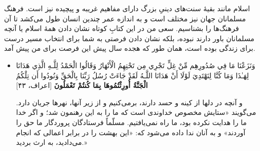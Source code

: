 اسلام مانند بقیهٔ سنت‌های دینیِ بزرگ دارای مفاهیم غریبه و پیچیده نیز است. فرهنگ مسلمانان جهان نیز مختلف است و به اندازه عمر چندین انسان طول می‌کشد تا آن فرهنگ‌ها را بشناسیم. سعی من در این کتابِ کوتاه نشان دادن همهٔ اسلام یا آنچه مسلمانان باور دارند نبوده، بلکه نشان دادن فرصتی به شما برای انتخاب مسیر درست برای زندگی بوده است، همان طور که هجده سال پیش این فرصت برای من پیش آمد.

\begin{itemize}
	\item[]
	{
		وَنَزَعْنَا مَا فِي صُدُورِهِم مِّنْ غِلٍّ تَجْرِي مِن تَحْتِهِمُ الْأَنْهَارُ  وَقَالُوا الْحَمْدُ لِلَّـهِ الَّذِي هَدَانَا لِهَـٰذَا وَمَا كُنَّا لِنَهْتَدِيَ لَوْلَا أَنْ هَدَانَا اللَّـهُ  لَقَدْ جَاءَتْ رُسُلُ رَبِّنَا بِالْحَقِّ  وَنُودُوا أَن تِلْكُمُ {\bfseries الْجَنَّةُ أُورِثْتُمُوهَا بِمَا كُنتُمْ تَعْمَلُونَ} [اعراف، ۴۳]} 
	
	{
		و آنچه در دلها از کینه و حسد دارند، برمی‌کنیم و از زیر آنها، نهرها جریان دارد. می‌گویند «ستایش مخصوص خداوندی است که ما را به این رهنمون شد؛ و اگر خدا ما را هدایت نکرده بود، ما راه نمی‌یافتیم. مسلّماً فرستادگان پروردگار ما حق را آوردند» و به آنان ندا داده می‌شود که: «این بهشت را در برابر اعمالی که انجام می‌دادید، به ارث بردید.» }
\end{itemize}







